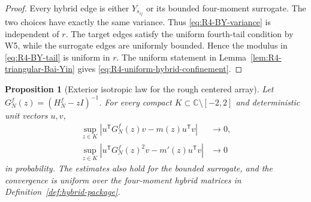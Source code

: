 \documentclass[10pt,a4paper]{amsart}
\newtheorem{proposition}[theorem]{Proposition}
\begin{document}
\begin{proof}
Every hybrid edge is either \(Y_{s_{ij}}\) or its bounded four-moment
surrogate.  The two choices have exactly the same variance.  Thus
\eqref{eq:R4-BY-variance} is independent of \(r\).  The target edges satisfy
the uniform fourth-tail condition by W5, while the surrogate edges are
uniformly bounded.  Hence the modulus in \eqref{eq:R4-BY-tail} is uniform in
\(r\).  The uniform statement in
Lemma~\ref{lem:R4-triangular-Bai-Yin} gives
\eqref{eq:R4-uniform-hybrid-confinement}.
\end{proof}

\begin{proposition}[Exterior isotropic law for the rough centered array]
\label{prop:R4-rough-isotropic}
Let \(G_N^f(z)=(H_N^f-zI)^{-1}\).  For every compact
\(K\subset\mathbb C\setminus[-2,2]\) and deterministic unit vectors \(u,v\),
\begin{align}
 \sup_{z\in K}\left|
 u^{\mathsf T}G_N^f(z)v-m(z)u^{\mathsf T}v
 \right|&\longrightarrow0,\label{eq:R4-rough-isotropic}\\
 \sup_{z\in K}\left|
 u^{\mathsf T}G_N^f(z)^2v-m'(z)u^{\mathsf T}v
 \right|&\longrightarrow0
 \label{eq:R4-rough-isotropic-derivative}
\end{align}
in probability.  The estimates also hold for the bounded surrogate, and the
convergence is uniform over the four-moment hybrid matrices in
Definition~\ref{def:hybrid-package}.
\end{proposition}
\end{document}

